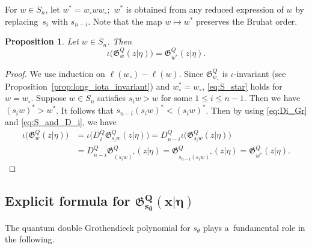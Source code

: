 \documentclass[10pt,a4paper]{amsart}
\numberwithin{equation}{section}
\newcommand{\Gro}[1]{\mathfrak{G}^Q_{#1}}
\newtheorem{Proposition}[Theorem]{Proposition}
\theoremstyle{definition}
\begin{document}
For $w\in S_n$, let
$w^*=w_\circ w w_\circ;$
$w^*$ is obtained from any
reduced expression of $w$ by replacing~$s_i$ with $s_{n-i}$.
Note that the map $w\mapsto w^*$ preserves the Bruhat order.
\begin{Proposition}\label{prop:S_star}
Let $w\in S_n$. Then
\begin{equation}
\iota\bigl(\Gro{w}(z|\eta)\bigr)=
\Gro{w^*}(z|\eta).
\label{eq:S_star}
\end{equation}
\end{Proposition}
\begin{proof}
We use induction on $\ell(w_\circ)-\ell(w)$.
Since $\Gro{w_\circ}$
is $\iota$-invariant (see Proposition~\ref{prop:long_iota_invariant})
and $w_\circ^*=w_\circ$, \eqref{eq:S_star} holds for $w=w_\circ$.
Suppose $w\in S_n$ satisfies
$s_iw>w$ for some $1\le i\le n-1$.
Then we have $(s_iw)^*>w^*$.
It follows that $s_{n-i}(s_iw)^*<(s_iw)^*$.
Then by using
\eqref{eq:Di_Gr} and
\eqref{eq:S_and_D_i}, we have
\begin{align*}
\iota\bigl(\Gro{w}(z|\eta)\bigr)&=
\iota\bigl(D_i^Q \Gro{s_iw}(z|\eta)\bigr)=D_{n-i}^Q \iota\bigl(\Gro{s_iw}(z|\eta)\bigr)\\
&=D_{n-i}^Q \Gro{(s_iw)^*}(z|\eta)=\Gro{s_{n-i}(s_iw)^*}(z|\eta)=\Gro{w^*}(z|\eta).\tag*{\qed}
\end{align*}\renewcommand{\qed}{}
\end{proof}

\subsection[Explicit formula for Gro\{s\_theta\}(x|eta)]{Explicit formula for $\boldsymbol{\Gro{s_\theta}(x|\eta)}$}
The quantum double Grothendieck polynomial for $s_\theta$ plays a~fundamental role
in the following.
\end{document}
